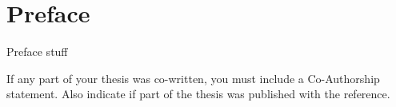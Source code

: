 \chapter{Preface}
Preface stuff

If any part of your thesis was co-written, you must include a
Co-Author\-ship statement. Also indicate if part of the thesis was published with the reference.
